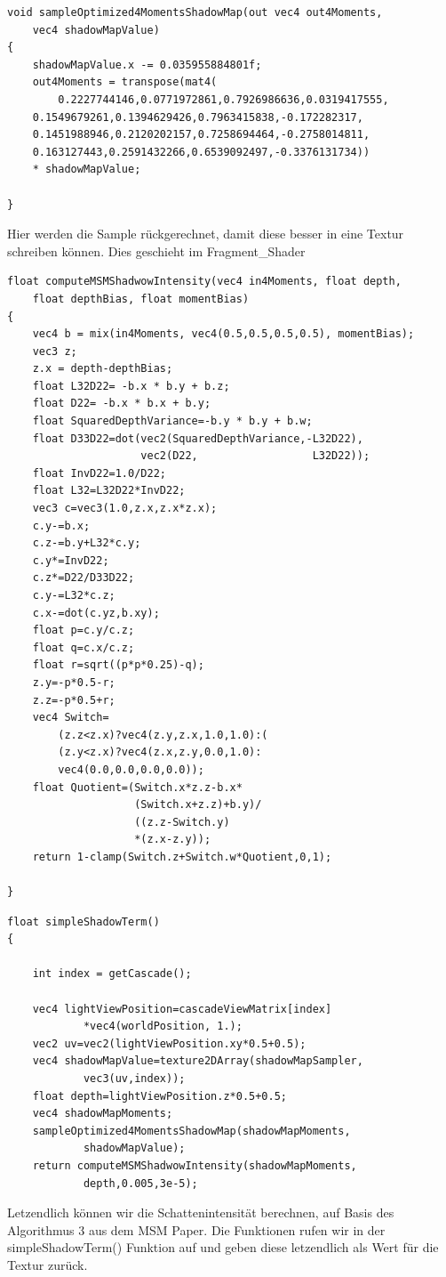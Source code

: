 \documentclass[runningheaders,a4paper]{llncs}
\begin{document}
\begin{lstlisting}
void sampleOptimized4MomentsShadowMap(out vec4 out4Moments, 
	vec4 shadowMapValue)
{
    shadowMapValue.x -= 0.035955884801f;
    out4Moments = transpose(mat4(     			
    	0.2227744146,0.0771972861,0.7926986636,0.0319417555,
    0.1549679261,0.1394629426,0.7963415838,-0.172282317,
    0.1451988946,0.2120202157,0.7258694464,-0.2758014811,
    0.163127443,0.2591432266,0.6539092497,-0.3376131734))
    * shadowMapValue;

}
\end{lstlisting}
Hier werden die Sample rückgerechnet, damit diese besser in eine Textur schreiben können.
Dies geschieht im Fragment\_Shader
\begin{lstlisting}
float computeMSMShadwowIntensity(vec4 in4Moments, float depth, 
	float depthBias, float momentBias)
{
    vec4 b = mix(in4Moments, vec4(0.5,0.5,0.5,0.5), momentBias);
    vec3 z;
    z.x = depth-depthBias;
    float L32D22= -b.x * b.y + b.z;
    float D22= -b.x * b.x + b.y;
    float SquaredDepthVariance=-b.y * b.y + b.w;
    float D33D22=dot(vec2(SquaredDepthVariance,-L32D22),
                     vec2(D22,                  L32D22));
    float InvD22=1.0/D22;
    float L32=L32D22*InvD22;
    vec3 c=vec3(1.0,z.x,z.x*z.x);
    c.y-=b.x;
    c.z-=b.y+L32*c.y;
    c.y*=InvD22;
    c.z*=D22/D33D22;
    c.y-=L32*c.z;
    c.x-=dot(c.yz,b.xy);
    float p=c.y/c.z;
    float q=c.x/c.z;
    float r=sqrt((p*p*0.25)-q);
    z.y=-p*0.5-r;
    z.z=-p*0.5+r;
    vec4 Switch=
        (z.z<z.x)?vec4(z.y,z.x,1.0,1.0):(
        (z.y<z.x)?vec4(z.x,z.y,0.0,1.0):
        vec4(0.0,0.0,0.0,0.0));
    float Quotient=(Switch.x*z.z-b.x*
    				(Switch.x+z.z)+b.y)/
    				((z.z-Switch.y)
    				*(z.x-z.y));
    return 1-clamp(Switch.z+Switch.w*Quotient,0,1);
    
}
\end{lstlisting}
\begin{lstlisting}
float simpleShadowTerm()
{
    
    int index = getCascade();

    vec4 lightViewPosition=cascadeViewMatrix[index]
    		*vec4(worldPosition, 1.);
    vec2 uv=vec2(lightViewPosition.xy*0.5+0.5);
    vec4 shadowMapValue=texture2DArray(shadowMapSampler, 
    		vec3(uv,index));
    float depth=lightViewPosition.z*0.5+0.5;
    vec4 shadowMapMoments;
    sampleOptimized4MomentsShadowMap(shadowMapMoments,
    		shadowMapValue);
    return computeMSMShadwowIntensity(shadowMapMoments,
    		depth,0.005,3e-5);
\end{lstlisting}
Letzendlich können wir die Schattenintensität berechnen, auf Basis des Algorithmus 3 aus dem MSM Paper.\cite{msm}
Die Funktionen rufen wir in der simpleShadowTerm() Funktion auf und geben diese letzendlich als Wert für die Textur zurück.
\end{document}
